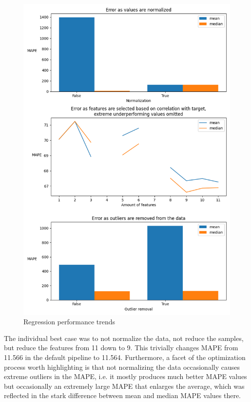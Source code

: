 \documentclass[12pt, letterpaper]{article}
\begin{document}
\begin{figure}[H]
    \centering
    \includegraphics[scale=0.7]{regression_performance.png}
    \caption{Regression performance trends}
    \label{reg_plt} %
\end{figure}

The individual best case was to not normalize the data, not reduce the samples, but reduce the features from 11 down to 9. This trivially changes MAPE from 11.566 in the default pipeline to 11.564. Furthermore, a facet of the optimization process worth highlighting is that not normalizing the data occasionally causes extreme outliers in the MAPE, i.e. it mostly produces much better MAPE values but occasionally an extremely large MAPE that enlarges the average, which was reflected in the stark difference between mean and median MAPE values there.
\end{document}
